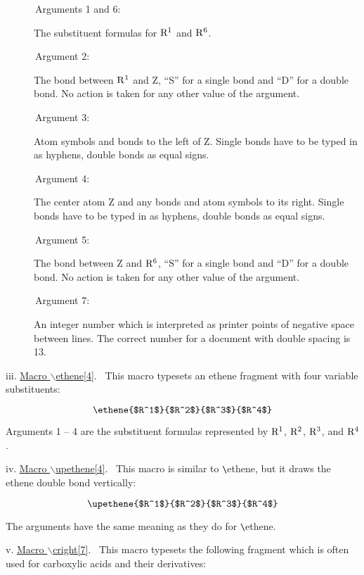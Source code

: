  \begin{description}
  \item[{\rm \ \ \ \ \ \ Arguments 1 and 6: }] The substituent formulas
       for ${\rm R^1}$ and ${\rm R^6}$.
  \item[{\rm \ \ \ \ \ \ Argument 2: }] The bond between ${\rm R^1}$
       and Z, ``S'' for a single bond and ``D'' for a double 
       bond. No action is taken for any other value of the
       argument.
  \item[{\rm \ \ \ \ \ \ Argument 3: }] Atom symbols and bonds to the
       left of Z. Single bonds have to be typed in as hyphens,
       double bonds as equal signs.
  \item[{\rm \ \ \ \ \ \ Argument 4: }] The center atom Z and any 
       bonds and atom symbols to its right. Single bonds have to
       be typed in as hyphens, double bonds as equal signs.
  \item[{\rm \ \ \ \ \ \ Argument 5: }] The bond between Z and 
       ${\rm R^6}$, ``S'' for a single bond and ``D'' for 
       a double bond. No action is taken for any other value
       of the argument.
 \newpage
  \item[{\rm \ \ \ \ \ \ Argument 7: }] An integer number which is interpreted
       as printer points of negative space between lines.
       The correct number for a document with double spacing
       is 13.
 \end{description}
 
 \vspace{\len mm}
 \indent iii. \underline{Macro $\backslash $ethene[4]}.
  \ This macro typesets an ethene fragment with four variable
 substituents:

 \[ \ethene{$R^1$}{$R^2$}{$R^3$}{$R^4$} \]

 Arguments 1 -- 4 are the substituent formulas represented by
 ${\rm R^1}$, ${\rm R^2}$, ${\rm R^3}$, and ${\rm R^4}$.
 
 \vspace{\len mm}
 \indent iv. \underline{Macro $\backslash $upethene[4]}.
  \ This macro is similar to \verb+\+ethene, but it draws
 the ethene double bond vertically:

 \[ \upethene{$R^1$}{$R^2$}{$R^3$}{$R^4$} \]
 
 The arguments have the same meaning as they do for 
 \verb+\+ethene.

 \vspace{\len mm}
 \indent v. \underline{Macro $\backslash $cright[7]}.
 \ This macro typesets the following fragment which is 
 often used for carboxylic acids and their derivatives:

